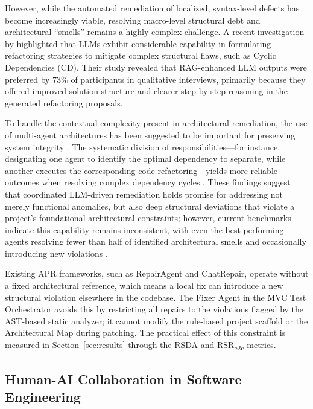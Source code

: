 However, while the automated remediation of localized, syntax-level
defects has become increasingly viable, resolving macro-level
structural debt and architectural ``smells'' \citep{Fontana2017}
remains a highly complex challenge. A recent investigation by
\citet{Pandini2025} highlighted that LLMs exhibit considerable
capability in formulating refactoring strategies to mitigate complex
structural flaws, such as Cyclic Dependencies (CD). Their study
revealed that RAG-enhanced LLM outputs were preferred by 73\% of
participants in qualitative interviews, primarily because they offered
improved solution structure and clearer step-by-step reasoning in the
generated refactoring proposals.

To handle the contextual complexity present in architectural
remediation, the use of multi-agent architectures has been suggested to be
important for preserving system integrity
\citep{Oueslati2025, Xu2025, Batole2025}. The systematic division of
responsibilities---for instance, designating one agent to identify the
optimal dependency to separate, while another executes the
corresponding code refactoring---yields more reliable outcomes when
resolving complex dependency cycles \citep{Pandini2025}. These findings
suggest that coordinated LLM-driven remediation holds promise for
addressing not merely functional anomalies, but also deep structural
deviations that violate a project's foundational architectural
constraints; however, current benchmarks indicate this capability
remains inconsistent, with even the best-performing agents resolving
fewer than half of identified architectural smells and occasionally
introducing new violations \citep{Dinu2026}.

Existing APR frameworks, such as RepairAgent and ChatRepair, operate
without a fixed architectural reference, which means a local fix can
introduce a new structural violation elsewhere in the codebase. The
Fixer Agent in the MVC Test Orchestrator avoids this by restricting
all repairs to the violations flagged by the AST-based static
analyzer; it cannot modify the rule-based project scaffold or the Architectural Map
during patching. The practical effect of this constraint is measured
in Section~\ref{sec:results} through the RSDA and RSR\textsubscript{e2e} metrics.

\subsection{Human-AI Collaboration in Software Engineering}
\label{sec:related_hitl}

